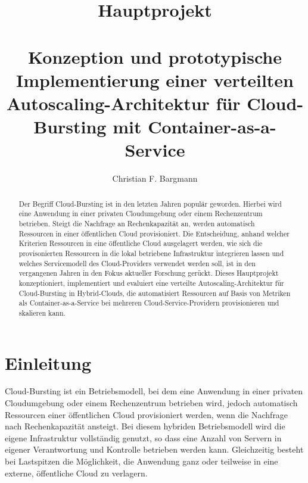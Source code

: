 \documentclass[runningheads]{llncs}
\begin{document}
%
\title{Hauptprojekt \\~\\ Konzeption und prototypische Implementierung einer verteilten Autoscaling-Architektur für Cloud-Bursting mit Container-as-a-Service}
%
%
\author{Christian F. Bargmann}
%
%
%
\maketitle              %
%
\begin{abstract} Der Begriff Cloud-Bursting ist in den letzten Jahren populär geworden. Hierbei wird eine Anwendung in einer privaten Cloudumgebung oder einem Rechenzentrum betrieben. Steigt die Nachfrage an Rechenkapazität an, werden automatisch Ressourcen in einer öffentlichen Cloud provisioniert. Die Entscheidung, anhand welcher Kriterien Res\-sourcen in eine öffentliche Cloud ausgelagert werden, wie sich die provisonierten Ressourcen in die lokal betriebene Infrastruktur integrieren lassen und welches Servicemodell des Cloud-Providers verwendet werden soll, ist in den vergangenen Jahren in den Fokus aktueller Forschung gerückt. Dieses Hauptprojekt konzeptioniert, implementiert und evaluiert eine verteilte Autoscaling-Architektur für Cloud-Bursting in Hybrid-Clouds, die automatisiert Ress\-ourcen auf Basis von Metriken als Container-as-a-Service bei mehreren Cloud-Service-Providern provisionieren und skalieren kann.
		
\end{abstract}
%
%
%
	
\section{Einleitung} \label{motivation}
	
Cloud-Bursting ist ein Betriebsmodell, bei dem eine Anwendung in einer privaten Cloudumgebung oder einem Rechenzentrum betrieben wird, jedoch automatisch Ressourcen einer öffentlichen Cloud provisioniert werden, wenn die Nachfrage nach Rechenkapazität ansteigt. Bei diesem hybriden Betriebsmodell wird die eigene Infrastruktur vollständig genutzt, so dass eine Anzahl von Servern in eigener Verantwortung und Kontrolle betrieben werden kann. Gleichzeitig besteht bei Lastspitzen die Möglichkeit, die Anwendung ganz oder teilweise in eine externe, öffentliche Cloud zu verlagern. \\
	
\end{document}
